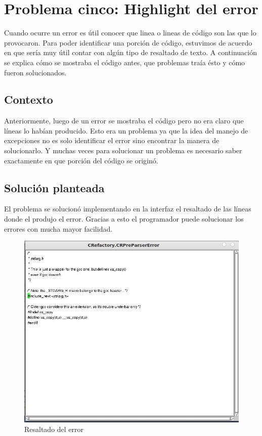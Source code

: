 \documentclass[a4paper,oneside,10pt]{article}
\begin{document}
\section{Problema cinco: Highlight del error}

Cuando ocurre un error es útil conocer que linea o lineas de código son las que lo provocaron. Para poder identificar una porción de código, estuvimos de acuerdo en que sería muy útil contar con algún tipo de resaltado de texto. A continuación se explica cómo se mostraba el código antes, que problemas traía ésto y cómo fueron solucionados.

\subsection{Contexto}
Anteriormente, luego de un error se mostraba el c\'odigo pero no era claro que l\'ineas lo hab\'ian producido. Esto era un problema ya que la idea del manejo de excepciones no es solo identificar el error sino encontrar la manera de solucionarlo. Y muchas veces para solucionar un problema es necesario saber exactamente en que porci\'on del c\'odigo se origin\'o.

\subsection{Soluci\'on planteada}
El problema se solucion\'o implementando en la interfaz el resaltado de las l\'ineas donde el produjo el error. Gracias a esto el programador puede solucionar los errores con mucha mayor facilidad.

\begin{figure}[h!]
  \centering
    \includegraphics[scale=0.50]{images/codigo_modificado/highlight_preparser.jpg}
     \caption{Resaltado del error}
\end{figure}
\end{document}
